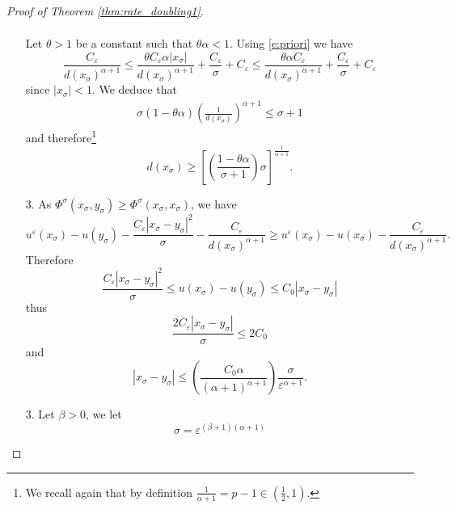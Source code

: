 \documentclass[11pt,reqno]{amsart}
\numberwithin{figure}{section}
\theoremstyle{plain}
\theoremstyle{remark}
\numberwithin{equation}{section}
\begin{document}
\begin{proof}[Proof of Theorem \ref{thm:rate_doubling1}]
\begin{enumerate}
\begin{align*}
    \end{align*}
    Let $\theta>1$ be a constant such that $\theta\alpha < 1$. Using \eqref{e:priori} we have
    \begin{equation*}
        \frac{C_\varepsilon}{d(x_\sigma)^{\alpha+1}} \leq  \frac{\theta C_\varepsilon \alpha|x_\sigma|}{d(x_\sigma)^{\alpha+1}} + \frac{C_\varepsilon}{\sigma}+ C_\varepsilon \leq \frac{\theta \alpha C_\varepsilon}{d(x_\sigma)^{\alpha+1}} + \frac{C_\varepsilon}{\sigma} + C_\varepsilon
    \end{equation*}
    since $|x_\sigma| < 1$. We deduce that 
    \begin{align*}
       \sigma (1-\theta \alpha)\left(\frac{1}{d(x_\sigma)}\right)^{\alpha+1} \leq \sigma + 1
    \end{align*}
    and therefore\footnote{We recall again that by definition $\frac{1}{\alpha+1} = p-1 \in \left(\frac{1}{2},1\right)$.}
    \begin{equation}\label{e:d(x_sigma)}
        d(x_\sigma) \geq \left[\left(\frac{1-\theta\alpha}{\sigma+1}\right)\sigma\right]^{\frac{1}{\alpha+1}}.
    \end{equation}
    \item[3.] As $\Phi^\sigma(x_\sigma,y_\sigma) \geq \Phi^\sigma(x_\sigma,x_\sigma)$, we have
    \begin{equation*}
         u^\varepsilon(x_\sigma) - u(y_\sigma) - \frac{C_\varepsilon |x_\sigma-y_\sigma|^2}{\sigma} - \frac{C_\varepsilon}{d(x_\sigma)^{\alpha+1}} \geq u^\varepsilon(x_\sigma) - u(x_\sigma) - \frac{C_\varepsilon}{d(x_\sigma)^{\alpha+1}}.
    \end{equation*}
    Therefore
    \begin{equation*}
        \frac{C_\varepsilon |x_\sigma-y_\sigma|^2}{\sigma} \leq u(x_\sigma) - u(y_\sigma) \leq C_0|x_\sigma-y_\sigma|
    \end{equation*}
    thus
    \begin{equation}\label{e:bdd_xi}
        \frac{2C_\varepsilon|x_\sigma - y_\sigma|}{\sigma} \leq 2C_0
    \end{equation}
    and 
    \begin{equation}\label{e:bd|x-y|}
        |x_\sigma - y_\sigma| \leq \left(\frac{C_0 \alpha}{(\alpha+1)^{\alpha+1}}\right) \frac{\sigma}{\varepsilon^{\alpha+1}}.
    \end{equation}
    \item[3.] Let $\beta > 0$, we let 
    \begin{equation}\label{e:scale}
        \sigma = \varepsilon^{(\beta+1)(\alpha+1)}

\end{equation}
\end{enumerate}
\end{proof}
\end{document}
